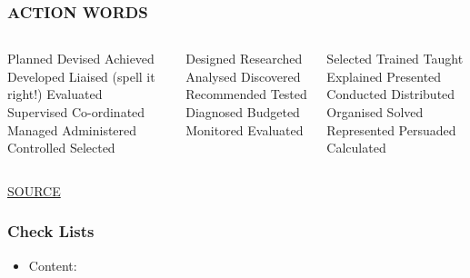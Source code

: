 \begin{frame}
\frametitle{ACTION WORDS}
\begin{columns}
	\begin{column}{0.3\textwidth}
Planned	Devised	Achieved
Developed	Liaised (spell it right!)	Evaluated
Supervised	Co-ordinated	Managed
Administered	Controlled	 Selected
	\end{column}
	\begin{column}{0.3\textwidth}  
Designed	Researched	Analysed
Discovered	Recommended	Tested
Diagnosed	Budgeted	Monitored
Evaluated	
	\end{column}
	\begin{column}{0.3\textwidth}   
Selected	Trained	Taught
Explained	Presented	Conducted
Distributed	Organised	Solved
Represented	Persuaded	Calculated	
	\end{column}
\end{columns}
\vspace{1cm}
\href{https://www.kent.ac.uk/careers/cv/actionverbs.htm}{SOURCE}

\end{frame}

\begin{frame}
	\frametitle{Check Lists}
	\begin{itemize}
		\item Content:
	\end{itemize}
\end{frame}

